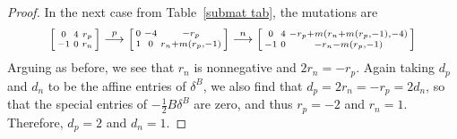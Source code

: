 \documentclass[10pt]{article}
\theoremstyle{definition}
\theoremstyle{remark}
\numberwithin{equation}{section}
\newcommand{\0}{{\mathbf{0}}}
\begin{document}
\begin{proof}
In the next case from Table~\ref{submat tab}, the mutations are
\[\begin{bsmallmatrix*}
0 & 4 & r_p\\
-1 & 0 &r_n
\end{bsmallmatrix*}\overset{p}{\longrightarrow}
\begin{bsmallmatrix*}
0 & -4 & -r_p\\
1 & 0 &r_n+m(r_p,-1)
\end{bsmallmatrix*}\overset{n}{\longrightarrow}
\begin{bsmallmatrix*}
0 & 4 &-r_p+m(r_n+m(r_p,-1),-4)\\
-1 & 0 &-r_n-m(r_p,-1)
\end{bsmallmatrix*}
\]
Arguing as before, we see that $r_n$ is nonnegative and $2r_n=-r_p$.
Again taking $d_p$ and $d_n$ to be the affine entries of $\delta^B$, we also find that $d_p=2r_n=-r_p=2d_n$, so that the special entries of $-\frac12B\delta^B$ are zero, and thus $r_p=-2$ and $r_n=1$.
Therefore,
$d_p=2$ and $d_n=1$.


\end{proof}
\end{document}
